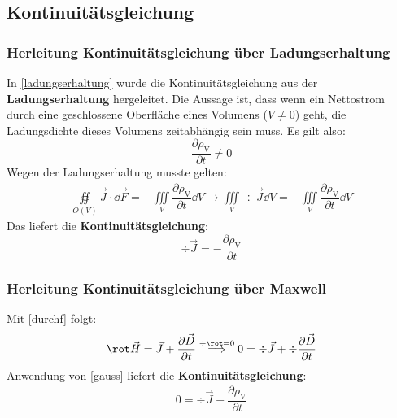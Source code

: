   \subsection{Kontinuitätsgleichung}\label{kontherl}
  \subsubsection{Herleitung Kontinuitätsgleichung über Ladungserhaltung}
	  \begin{center}
		  
	  \end{center}
		  In \ref{ladungserhaltung} wurde die Kontinuitätsgleichung aus der \textbf{Ladungserhaltung} hergeleitet. Die Aussage ist, dass wenn ein Nettostrom durch eine geschlossene Oberfläche eines Volumens ($V\neq 0$) geht, die Ladungsdichte dieses Volumens zeitabhängig sein muss. Es gilt also:
		        \begin{equation}
			        \dfrac{\partial \rho_\text{V}}{\partial t} \neq 0
		        \end{equation}
		   Wegen der Ladungserhaltung musste gelten:
		        \begin{equation}\begin{split}
				        \oiint\limits_{O(V)} \vec{J} \cdot \dd{}{\vec{F}} = -\iiint\limits_{V} \dfrac{\partial \rho_\text{V}}{\partial t} \dd V
				        \to \iiint\limits_{V} \div \vec{J} \dd V  = -\iiint\limits_{V} \dfrac{\partial \rho_\text{V}}{\partial t} \dd V
			        \end{split}\end{equation}
		   Das liefert die \textbf{Kontinuitätsgleichung}:
		        \begin{equation}\label{kont}
			        \boxed{\div \vec{J} = -\dfrac{\partial \rho_\text{V}}{\partial t}}
		        \end{equation}
  \subsubsection{Herleitung Kontinuitätsgleichung über Maxwell}
  Mit \ref{durchf} folgt:
		        \begin{equation}\begin{split}\rot \vec{H}=\vec{J} +\frac{\partial \vec{D}}{\partial t}	\stackrel{\div \rot = 0}{\Longrightarrow} 0 = \div \vec{J} + \div \dfrac{\partial \vec{D} }{\partial t}
			        \end{split}\end{equation}
	Anwendung von \ref{gauss} liefert die \textbf{Kontinuitätsgleichung}:
		        \begin{equation}\begin{split}
				        0 = \div \vec{J} + \dfrac{\partial \rho_\text{V}}{\partial t}
			        \end{split}\end{equation}
